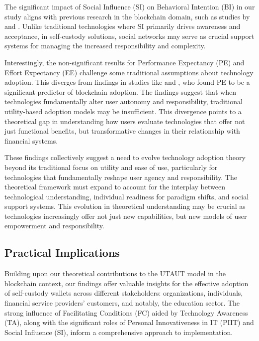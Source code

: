 \documentclass[twocolumn]{article}
\begin{document}
The significant impact of Social Influence (SI) on Behavioral Intention (BI) in our study aligns with previous research in the blockchain domain, such as studies by \textcite{ferri_ascertaining_2021} and \textcite{kumari_impact_2022}. Unlike traditional technologies where SI primarily drives awareness and acceptance, in self-custody solutions, social networks may serve as crucial support systems for managing the increased responsibility and complexity.

Interestingly, the non-significant results for Performance Expectancy (PE) and Effort Expectancy (EE) challenge some traditional assumptions about technology adoption. This diverges from findings in studies like \textcite{baltruschat_user_2023} and \textcite{chang_acceptance_2022}, who found PE to be a significant predictor of blockchain adoption. The findings suggest that when technologies fundamentally alter user autonomy and responsibility, traditional utility-based adoption models may be insufficient. This divergence points to a theoretical gap in understanding how users evaluate technologies that offer not just functional benefits, but transformative changes in their relationship with financial systems.

These findings collectively suggest a need to evolve technology adoption theory beyond its traditional focus on utility and ease of use, particularly for technologies that fundamentally reshape user agency and responsibility. The theoretical framework must expand to account for the interplay between technological understanding, individual readiness for paradigm shifts, and social support systems. This evolution in theoretical understanding may be crucial as technologies increasingly offer not just new capabilities, but new models of user empowerment and responsibility.

\subsection{Practical Implications}

Building upon our theoretical contributions to the UTAUT model in the blockchain context, our findings offer valuable insights for the effective adoption of self-custody wallets across different stakeholders: organizations, individuals, financial service providers' customers, and notably, the education sector. The strong influence of Facilitating Conditions (FC) aided by Technology Awareness (TA), along with the significant roles of Personal Innovativeness in IT (PIIT) and Social Influence (SI), inform a comprehensive approach to implementation.
\end{document}
